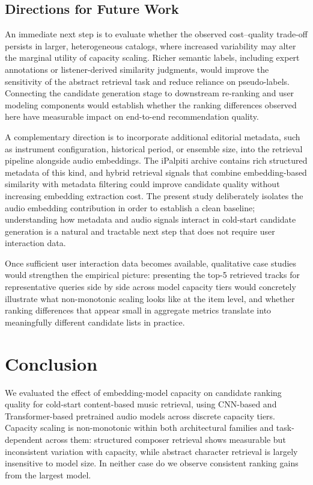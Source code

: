 \documentclass{CPP}
\begin{document}
\section{Directions for Future Work}

An immediate next step is to evaluate whether the observed cost--quality trade-off persists in larger, heterogeneous catalogs, where increased variability may alter the marginal utility of capacity scaling. Richer semantic labels, including expert annotations or listener-derived similarity judgments, would improve the sensitivity of the abstract retrieval task and reduce reliance on pseudo-labels. Connecting the candidate generation stage to downstream re-ranking and user modeling components would establish whether the ranking differences observed here have measurable impact on end-to-end recommendation quality.

A complementary direction is to incorporate additional editorial metadata, such as instrument configuration, historical period, or ensemble size, into the retrieval pipeline alongside audio embeddings. The iPalpiti archive contains rich structured metadata of this kind, and hybrid retrieval signals that combine embedding-based similarity with metadata filtering could improve candidate quality without increasing embedding extraction cost. The present study deliberately isolates the audio embedding contribution in order to establish a clean baseline; understanding how metadata and audio signals interact in cold-start candidate generation is a natural and tractable next step that does not require user interaction data.

Once sufficient user interaction data becomes available, qualitative case studies would strengthen the empirical picture: presenting the top-5 retrieved tracks for representative queries side by side across model capacity tiers would concretely illustrate what non-monotonic scaling looks like at the item level, and whether ranking differences that appear small in aggregate metrics translate into meaningfully different candidate lists in practice.

\chapter{Conclusion}

We evaluated the effect of embedding-model capacity on candidate ranking quality for cold-start content-based music retrieval, using CNN-based and Transformer-based pretrained audio models across discrete capacity tiers. Capacity scaling is non-monotonic within both architectural families and task-dependent across them: structured composer retrieval shows measurable but inconsistent variation with capacity, while abstract character retrieval is largely insensitive to model size. In neither case do we observe consistent ranking gains from the largest model.
\end{document}
